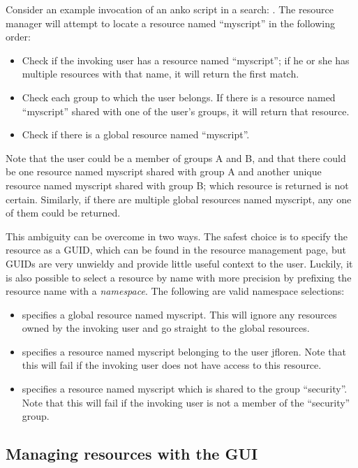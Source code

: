 Consider an example invocation of an anko script in a search: . The resource manager will attempt to locate a resource named
``myscript'' in the following order:

\begin{itemize}
\item
  Check if the invoking user has a resource named ``myscript''; if he
  or she has multiple resources with that name, it will return the first
  match.
\item
  Check each group to which the user belongs. If there is a resource
  named ``myscript'' shared with one of the user's groups, it will
  return that resource.
\item
  Check if there is a global resource named ``myscript''.
\end{itemize}

Note that the user could be a member of groups A and B, and that there
could be one resource named myscript shared with group A and another
unique resource named myscript shared with group B; which resource
is returned is not certain. Similarly, if there are multiple global
resources named myscript, any one of them could be returned.

This ambiguity can be overcome in two ways. The safest choice is to
specify the resource as a GUID, which can be found in the resource
management page, but GUIDs are very unwieldy and provide little useful
context to the user. Luckily, it is also possible to select a resource
by name with more precision by prefixing the resource name with a
\emph{namespace}. The following are valid namespace selections:

\begin{itemize}
\item
   specifies a global resource named myscript.
  This will ignore any resources owned by the invoking user and go
  straight to the global resources.
\item
   specifies a resource named
  myscript belonging to the user jfloren. Note that this will
  fail if the invoking user does not have access to this resource.
\item
   specifies a resource named
  myscript which is shared to the group ``security''. Note that this
  will fail if the invoking user is not a member of the
  ``security'' group.
\end{itemize}

\subsection{Managing resources with the GUI}


